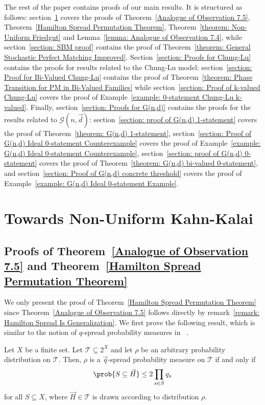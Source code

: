 \documentclass[12pt]{article}
\begin{document}
The rest of the paper contains proofs of our main results. It is structured as follows: section~\ref{section: Proofs of Non-Uniform Spread Results} covers the proofs of Theorem~\ref{Analogue of Observation 7.5}, Theorem~\ref{Hamilton Spread Permutation Theorem}, Theorem~\ref{theorem: Non-Uniform Friedgut} and Lemma~\ref{lemma: Analogue of Observation 7.4}, while section~\ref{section: SBM proof} contains the proof of Theorem~\ref{theorem: General Stochastic Perfect Matching Improved}. Section~\ref{section: Proofs for Chung-Lu} contains the proofs for results related to the Chung-Lu model: section~\ref{section: Proof for Bi-Valued Chung-Lu} contains the proof of Theorem~\ref{theorem: Phase Transition for PM in Bi-Valued Families} while section~\ref{section: Proof of k-valued Chung-Lu} covers the proof of Example~\ref{example: 0-statement Chung-Lu k-valued}. Finally, section~\ref{section: Proofs for G(n,d)} contains the proofs for the results related to $\mathcal{G}(n,\vec{d})$: section~\ref{section: proof of G(n,d) 1-statement} covers the proof of Theorem~\ref{theorem: G(n,d) 1-statement}, section~\ref{section: Proof of G(n,d) Ideal 0-statement Counterexample} covers the proof of Example~\ref{example: G(n,d) Ideal 0-statement Counterexample}, section~\ref{section: proof of G(n,d) 0-statement} covers the proof of Theorem~\ref{theorem: G(n,d) bi-valued 0-statement}, and section~\ref{section: Proof of G(n,d) concrete threshold} covers the proof of Example~\ref{example: G(n,d) Ideal 0-statement Example}.


\section{Towards Non-Uniform Kahn-Kalai}
\label{section: Proofs of Non-Uniform Spread Results}

\subsection{Proofs of Theorem~\ref{Analogue of Observation 7.5} and Theorem~\ref{Hamilton Spread Permutation Theorem}}

We only present the proof of Theorem~\ref{Hamilton Spread Permutation Theorem} since Theorem~\ref{Analogue of Observation 7.5} follows directly by remark~\ref{remark: Hamilton Spread Is Generalization}. We first prove the following result, which is similar to the notion of $q$-spread probability measures in ~\cite{mossel2022secondkahnkalaiconjecture}.


\begin{theorem}
\label{Spreadness for Family of Graphs Theorem}
Let $X$ be a finite set. Let $\mathcal{T}\subseteq 2^X$ and let $\rho$ be an arbitrary probability distribution on $\mathcal{T}$. Then, $\rho$ is a $\vec{q}$-spread probability measure on $\mathcal{T}$ if and only if
\[
    \prob{S\subseteq\vec{H}}\leq\displaystyle 2\prod\limits_{s\in S} q_s
\]
for all $S\subseteq X$, where $\vec{H}\in \mathcal{T}$ is drawn according to distribution $\rho$.
\end{theorem}
\end{document}
